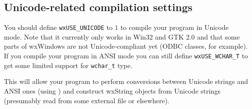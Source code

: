 
\subsection{Unicode-related compilation settings}

You should define {\tt wxUSE\_UNICODE} to $1$ to compile your program in
Unicode mode. Note that it currently only works in Win32 and GTK 2.0 and
that some parts of
wxWindows are not Unicode-compliant yet (ODBC classes, for example). If you
compile your program in ANSI mode you can still define {\tt wxUSE\_WCHAR\_T} 
to get some limited support for {\tt wchar\_t} type.

This will allow your program to perform conversions between Unicode strings and
ANSI ones (using ) 
and construct wxString objects from Unicode strings (presumably read
from some external file or elsewhere).

